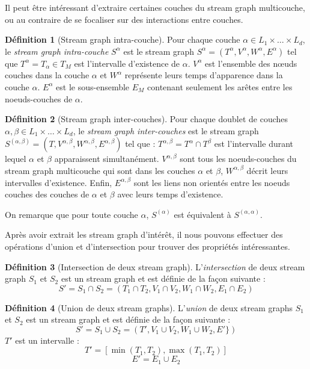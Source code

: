 \documentclass[11pt,a4paper]{article}
\theoremstyle{definition}
\newtheorem{defn}{Définition}
\theoremstyle{remark}
\theoremstyle{remark}
\def \stg {stream graph}
\def \Stg {Stream graph}
\def \stgm {stream graph multicouche}
\def \stgs {stream graphs}
\begin{document}
	Il peut être intéressant d'extraire certaines couches du \stgm{}, ou au contraire de se focaliser sur des interactions entre couches.
	 
	\begin{defn}[\Stg{} intra-couche]
	Pour chaque couche $\alpha \in L_1 \times \dots \times L_d$, le {\em \stg{} intra-couche} $S^{\alpha}$ est le \stg{} $S^{\alpha}=(T^{\alpha},V^{\alpha},W^{\alpha},E^{\alpha})$ tel que $T^{\alpha} = T_{\alpha} \in T_M$ est l'intervalle d'existence de $\alpha$. $V^{\alpha}$ est l'ensemble des nœuds couches dans la couche $\alpha$ et $W^{\alpha}$ représente leurs temps d'apparence dans la couche $\alpha$. $E^{\alpha}$ est le sous-ensemble $E_M$ contenant seulement les arêtes entre les noeuds-couches de $\alpha$.
	\end{defn}
	
	
	\begin{defn}[\Stg{} inter-couches]	
	Pour chaque doublet de couches $\alpha, \beta \in L_1\times \dots\times L_d$, le {\em \stg{} inter-couches} est le \stg{} $S^{(\alpha,\beta)} = (T, V^{\alpha,\beta},W^{\alpha,\beta},E^{\alpha,\beta})$ tel que : $T^{\alpha,\beta}=T^{\alpha}\cap T^{\beta}$ est l'intervalle durant lequel $\alpha$ et $\beta$ apparaissent simultanément. $V^{\alpha,\beta}$ sont tous les noeuds-couches du \stgm{} qui sont dans les couches $\alpha$ et $\beta$, $W^{\alpha,\beta}$ décrit leurs intervalles d'existence. Enfin, $E^{\alpha,\beta}$ sont les liens non orientés entre les noeuds couches des couches de $\alpha$ et $\beta$ avec leurs temps d'existence.
	\end{defn}
	

	On remarque que pour toute couche $\alpha$, $S^{(\alpha)}$ est équivalent à $S^{(\alpha,\alpha)}$.


	Après avoir extrait les \stg{} d'intérêt, il nous pouvons effectuer des opérations d'union et d'intersection pour trouver des propriétés intéressantes.
	
	\begin{defn}[Intersection de deux \stg{}]
	L'{\em intersection} de deux \stg{} $S_1$ et $S_2$ est un \stg{} et est définie de la façon suivante :
	\[
		S' = S_1 \cap S_2 = (T_1\cap T_2, V_1 \cap V_2, W_1 \cap W_2, E_1\cap E_2)
	\]
	\end{defn}
	

	\begin{defn}[Union de deux \stgs{}]
	L'{\em union} de deux \stgs{} $S_1$ et $S_2$ est un \stg{} et est définie de la façon suivante :
	\[
		S' = S_1 \cup S_2 = (T', V_1 \cup V_2, W_1 \cup W_2, E' \})
	\]
	$T'$ est un intervalle :
	\[
		T' = [\min(T_1,T_2),\max(T_1,T_2)]
	\]
	\[
		E' = E_1 \cup E_2 
	\]
	
	\end{defn}
	
\end{document}
